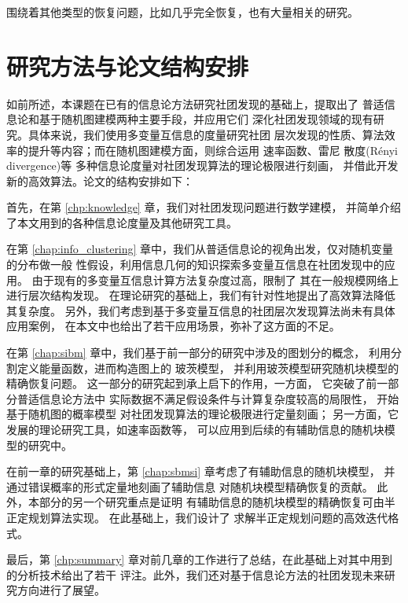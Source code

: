 
围绕着其他类型的恢复问题，比如几乎完全恢复，也有大量相关的研究\cite{kanade2016global, deshpande2018contextual}。

\section{研究方法与论文结构安排}
如前所述，本课题在已有的信息论方法研究社团发现的基础上，提取出了
普适信息论和基于随机图建模两种主要手段，并应用它们
深化社团发现领域的现有研究。具体来说，我们使用多变量互信息的度量研究社团
层次发现的性质、算法效率的提升等内容；而在随机图建模方面，则综合运用
速率函数、雷尼
散度(Rényi divergence)等
多种信息论度量对社团发现算法的理论极限进行刻画，
并借此开发新的高效算法。论文的结构安排如下：

首先，在第 \ref{chp:knowledge} 章，我们对社团发现问题进行数学建模，
并简单介绍了本文用到的各种信息论度量及其他研究工具。

在第 \ref{chap:info_clustering} 章中，我们从普适信息论的视角出发，仅对随机变量的分布做一般
性假设，利用信息几何的知识探索多变量互信息在社团发现中的应用。
由于现有的多变量互信息计算方法复杂度过高，限制了
其在一般规模网络上进行层次结构发现。
在理论研究的基础上，我们有针对性地提出了高效算法降低其复杂度。
另外，我们考虑到基于多变量互信息的社团层次发现算法尚未有具体应用案例，
在本文中也给出了若干应用场景，弥补了这方面的不足。

在第 \ref{chap:sibm} 章中，我们基于前一部分的研究中涉及的图划分的概念，
利用分割定义能量函数，进而构造图上的 玻茨模型，
并利用玻茨模型研究随机块模型的精确恢复问题。
这一部分的研究起到承上启下的作用，一方面，
它突破了前一部分普适信息论方法中
实际数据不满足假设条件与计算复杂度较高的局限性，
开始基于随机图的概率模型
对社团发现算法的理论极限进行定量刻画；
另一方面，它发展的理论研究工具，如速率函数等，
可以应用到后续的有辅助信息的随机块模型的研究中。

在前一章的研究基础上，第 \ref{chap:sbmsi} 章考虑了有辅助信息的随机块模型，
并通过错误概率的形式定量地刻画了辅助信息
对随机块模型精确恢复的贡献。
此外，本部分的另一个研究重点是证明
有辅助信息的随机块模型的精确恢复可由半正定规划算法实现。
在此基础上，我们设计了
求解半正定规划问题的高效迭代格式。

最后，第 \ref{chp:summary} 章对前几章的工作进行了总结，在此基础上对其中用到的分析技术给出了若干
评注。此外，我们还对基于信息论方法的社团发现未来研究方向进行了展望。